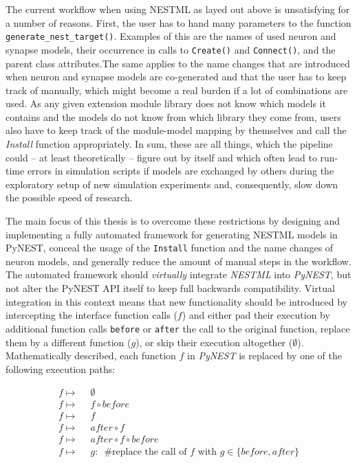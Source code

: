 The current workflow when using NESTML as layed out above is unsatisfying for a number of reasons. First, the user has to hand many parameters to the function \texttt{generate\_nest\_target()}. Examples of this are the names of used neuron and synapse models, their occurrence in calls to \texttt{Create()} and \texttt{Connect()}, and the parent class attributes.The same applies to the name changes that are introduced when neuron and synapse models are co-generated and that the user has to keep track of manually, which might become a real burden if a lot of combinations are used. As any given extension module library does not know which models it contains and the models do not know from which library they come from, users also have to keep track of the module-model mapping by themselves and call the \emph{Install} function appropriately. In sum, these are all things, which the pipeline could -- at least theoretically -- figure out by itself and which often lead to run-time errors in simulation scripts if models are exchanged by others during the exploratory setup of new simulation experiments and, consequently, slow down the possible speed of research. 

The main focus of this thesis is to overcome these restrictions by designing and implementing a fully automated framework for generating NESTML models in PyNEST, conceal the usage of the \texttt{Install} function and the name changes of neuron models, and generally reduce the amount of manual steps in the workflow. The automated framework should \emph{virtually} integrate \emph{NESTML} into \emph{PyNEST}, but not alter the PyNEST API itself to keep full backwards compatibility. Virtual integration in this context means that new functionality should be introduced by intercepting the interface function calls ($f$) and either pad their execution by additional function calls \texttt{before} or \texttt{after} the call to the original function, replace them by a different function ($g$), or skip their execution altogether ($\emptyset$). Mathematically described, each function $f$ in \emph{PyNEST} is replaced by one of the following execution paths:

\begin{align*}
  f \mapsto & \enspace\emptyset                                                                         \\
  f \mapsto & \enspace f \circ before                                                                   \\
  f \mapsto & \enspace f                                                                                \\
  f \mapsto & \enspace after \circ f                                                                    \\
  f \mapsto & \enspace after \circ f \circ before                                                       \\
  f \mapsto & \enspace g:\enspace \text{\#replace the call of } f \text{ with } g \in \{before, after\} \\
\end{align*}

